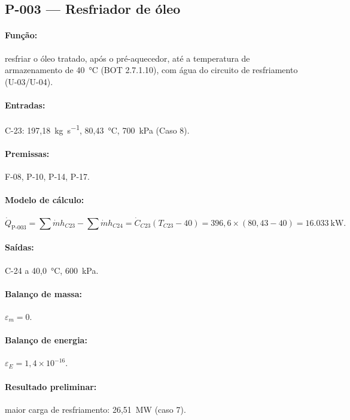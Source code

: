 \documentclass[11pt,a4paper]{article}
\numberwithin{equation}{section}
\numberwithin{table}{section}
\numberwithin{figure}{section}
\begin{document}
\subsection{P-003 --- Resfriador de óleo}
\paragraph{Função:} resfriar o óleo tratado, após o pré-aquecedor, até a temperatura de armazenamento de 40~\si{\celsius} (BOT 2.7.1.10), com água do circuito de resfriamento (U-03/U-04).
\paragraph{Entradas:} C-23: 197,18~\si{\kilogram\per\second}, 80,43~\si{\celsius}, 700~\si{\kilo\pascal} (Caso 8).
\paragraph{Premissas:} F-08, P-10, P-14, P-17.
\paragraph{Modelo de cálculo:}
\begin{equation}
\dot Q_{\mbox{P-003}}=\sum\dot m h_{C23}-\sum\dot m h_{C24}=\dot C_{C23}(T_{C23}-40)=396{,}6\times(80{,}43-40)=16.033\ \mathrm{kW}.
\end{equation}
\paragraph{Saídas:} C-24 a 40,0~\si{\celsius}, 600~\si{\kilo\pascal}.
\paragraph{Balanço de massa:} $\varepsilon_m=$$0$.
\paragraph{Balanço de energia:} $\varepsilon_E=$$1{,}4\times10^{-16}$.
\paragraph{Resultado preliminar:} maior carga de resfriamento: 26,51~\si{\mega\watt} (caso 7).
\end{document}
